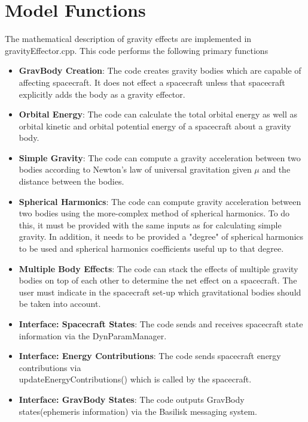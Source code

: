 \section{Model Functions}
The mathematical description of gravity effects are implemented in gravityEffector.cpp. This code performs the following primary functions
\begin{itemize}
	\item \textbf{GravBody Creation}: The code creates gravity bodies which are capable of affecting spacecraft. It does not effect a spacecraft unless that spacecraft explicitly adds the body as a gravity effector.
	\item \textbf{Orbital Energy}: The code can calculate the total orbital energy as well as orbital kinetic and orbital potential energy of a spacecraft about a gravity body.
	\item \textbf{Simple Gravity}: The code can compute a gravity acceleration between two bodies according to Newton's law of universal gravitation given $\mu$ and the distance between the bodies.
	\item \textbf{Spherical Harmonics}: The code can compute gravity acceleration between two bodies using the more-complex method of spherical harmonics. To do this, it must be provided with the same inputs as for calculating simple gravity. In addition, it needs to be provided a "degree" of spherical harmonics to be used and spherical harmonics coefficients useful up to that degree.
	\item \textbf{Multiple Body Effects}: The code can stack the effects of multiple gravity bodies on top of each other to determine the net effect on a spacecraft. The user must indicate in the spacecraft set-up which gravitational bodies should be taken into account.
	\item \textbf{Interface: Spacecraft States}: The code sends and receives spacecraft state information via the DynParamManager.
	\item \textbf{Interface: Energy Contributions}: The code sends spacecraft energy contributions via \\updateEnergyContributions() which is called by the spacecraft.
	\item \textbf{Interface: GravBody States}: The code outputs GravBody states(ephemeris information) via the Basilisk messaging system.
	
\end{itemize}